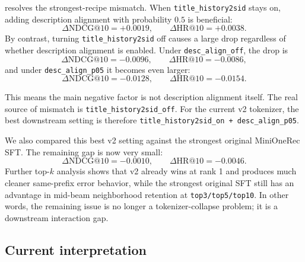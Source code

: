  resolves the strongest-recipe mismatch. When \texttt{title\_history2sid} stays on, adding description alignment with probability $0.5$ is beneficial:
\[
\Delta \mathrm{NDCG}@10 = +0.0019,\qquad
\Delta \mathrm{HR}@10 = +0.0038.
\]
By contrast, turning \texttt{title\_history2sid} off causes a large drop regardless of whether description alignment is enabled. Under \texttt{desc\_align\_off}, the drop is
\[
\Delta \mathrm{NDCG}@10 = -0.0096,\qquad
\Delta \mathrm{HR}@10 = -0.0086,
\]
and under \texttt{desc\_align\_p05} it becomes even larger:
\[
\Delta \mathrm{NDCG}@10 = -0.0128,\qquad
\Delta \mathrm{HR}@10 = -0.0154.
\]

This means the main negative factor is not description alignment itself. The real source of mismatch is \texttt{title\_history2sid\_off}. For the current v2 tokenizer, the best downstream setting is therefore \texttt{title\_history2sid\_on + desc\_align\_p05}.

We also compared this best v2 setting against the strongest original MiniOneRec SFT. The remaining gap is now very small:
\[
\Delta \mathrm{NDCG}@10 = -0.0010,\qquad
\Delta \mathrm{HR}@10 = -0.0046.
\]
Further top-$k$ analysis shows that v2 already wins at rank 1 and produces much cleaner same-prefix error behavior, while the strongest original SFT still has an advantage in mid-beam neighborhood retention at \texttt{top3/top5/top10}. In other words, the remaining issue is no longer a tokenizer-collapse problem; it is a downstream interaction gap.

\subsection{Current interpretation}

